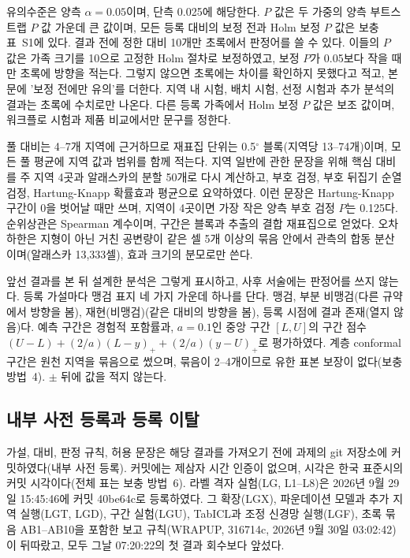 유의수준은 양측 $\alpha = 0.05$이며, 단측 0.025에 해당한다. $P$ 값은 두 가중의 양측 부트스트랩 $P$ 값 가운데 큰 값이며, 모든 등록 대비의 보정 전과 Holm 보정 $P$ 값은 보충 표~S1에 있다. 결과 전에 정한 대비 10개만 초록에서 판정어를 쓸 수 있다. 이들의 $P$ 값은 가족 크기를 10으로 고정한 Holm 절차\cite{Holm1979}로 보정하였고, 보정 $P$가 0.05보다 작을 때만 초록에 방향을 적는다. 그렇지 않으면 초록에는 차이를 확인하지 못했다고 적고, 본문에 '보정 전에만 유의'를 더한다. 지역 내 시험, 배치 시험, 선정 시험과 추가 분석의 결과는 초록에 수치로만 나온다. 다른 등록 가족에서 Holm 보정 $P$ 값은 보조 값이며, 워크플로 시험과 제품 비교에서만 문구를 정한다.

풀 대비는 4--7개 지역에 근거하므로 재표집 단위는 0.5$^{\circ}$ 블록(지역당 13--74개)이며, 모든 풀 평균에 지역 값과 범위를 함께 적는다. 지역 일반에 관한 문장을 위해 핵심 대비를 주 지역 4곳과 알래스카의 분할 50개로 다시 계산하고, 부호 검정, 부호 뒤집기 순열 검정, Hartung-Knapp 확률효과 평균\cite{HartungKnapp2001}으로 요약하였다. 이런 문장은 Hartung-Knapp 구간이 0을 벗어날 때만 쓰며, 지역이 4곳이면 가장 작은 양측 부호 검정 $P$는 0.125다. 순위상관은 Spearman 계수이며, 구간은 블록과 추출의 결합 재표집으로 얻었다. 오차 하한은 지형이 아닌 거친 공변량이 같은 셀 5개 이상의 묶음 안에서 관측의 합동 분산이며(알래스카 13,333셀), 효과 크기의 분모로만 쓴다.

앞선 결과를 본 뒤 설계한 분석은 그렇게 표시하고, 사후 서술에는 판정어를 쓰지 않는다. 등록 가설마다 맹검 표지 네 가지 가운데 하나를 단다. 맹검, 부분 비맹검(다른 규약에서 방향을 봄), 재현(비맹검)(같은 대비의 방향을 봄), 등록 시점에 결과 존재(열지 않음)다. 예측 구간은 경험적 포함률과, $a = 0.1$인 중앙 구간 $[L, U]$의 구간 점수 $(U - L) + (2/a)(L - y)_{+} + (2/a)(y - U)_{+}$로 평가하였다\cite{GneitingRaftery2007}. 계층 conformal 구간은 원천 지역을 묶음으로 썼으며\cite{Dunn2023}, 묶음이 2--4개이므로 유한 표본 보장이 없다(보충 방법~4). $\pm$ 뒤에 값을 적지 않는다.

\subsection{내부 사전 등록과 등록 이탈}\label{sec:m-registration}

가설, 대비, 판정 규칙, 허용 문장은 해당 결과를 가져오기 전에 과제의 git 저장소에 커밋하였다(내부 사전 등록). 커밋에는 제삼자 시간 인증이 없으며, 시각은 한국 표준시의 커밋 시각이다(전체 표는 보충 방법~6). 라벨 격자 실험(LG, L1--L8)은 2026년 9월 29일 15:45:46에 커밋 40be64c로 등록하였다. 그 확장(LGX), 파운데이션 모델과 추가 지역 실행(LGT, LGD), 구간 실험(LGU), TabICL과 조정 신경망 실행(LGF), 초록 묶음 AB1--AB10을 포함한 보고 규칙(WRAPUP, 316714c, 2026년 9월 30일 03:02:42)이 뒤따랐고, 모두 그날 07:20:22의 첫 결과 회수보다 앞섰다.

